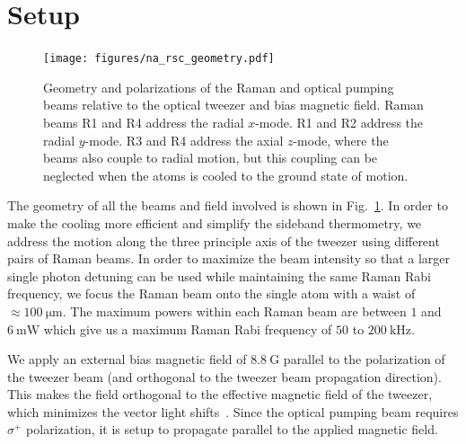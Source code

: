 \section{Setup}
\label{ch:rsc:setup}

\begin{figure}
  \centering
  \texttt{[image: figures/na\_rsc\_geometry.pdf]}
  \caption[Beams and field geometry for Sodium Raman sideband cooling]{
    Geometry and polarizations of the Raman and optical pumping beams relative to the
    optical tweezer and bias magnetic field.
    Raman beams R1 and R4 address the radial $x$-mode.
    R1 and R2 address the radial $y$-mode.
    R3 and R4 address the axial $z$-mode, where the beams also couple to radial motion,
    but this coupling can be neglected when the atoms is cooled to the ground state of motion.
    \label{fig:rsc:na-geometry}}
\end{figure}

The geometry of all the beams and field involved is shown in Fig.~\ref{fig:rsc:na-geometry}.
In order to make the cooling more efficient and simplify the sideband thermometry,
we address the motion along the three principle axis of the tweezer using different pairs
of Raman beams.
In order to maximize the beam intensity so that a larger single photon detuning can be used
while maintaining the same Raman Rabi frequency,
we focus the Raman beam onto the single atom with a waist of $\approx\!100~\mathrm{\mu m}$.
The maximum powers within each Raman beam are between $1$ and $6~\mathrm{mW}$
which give us a maximum Raman Rabi frequency of $50$ to $200~\mathrm{kHz}$.

We apply an external bias magnetic field of $8.8~\mathrm{G}$ parallel to the polarization
of the tweezer beam (and orthogonal to the tweezer beam propagation direction).
This makes the field orthogonal to the effective magnetic field of the tweezer,
which minimizes the vector light shifts~\cite{kaufman_cooling_2012,thompson_coherence_2013}.
Since the optical pumping beam requires $\sigma^+$ polarization,
it is setup to propagate parallel to the applied magnetic field.

